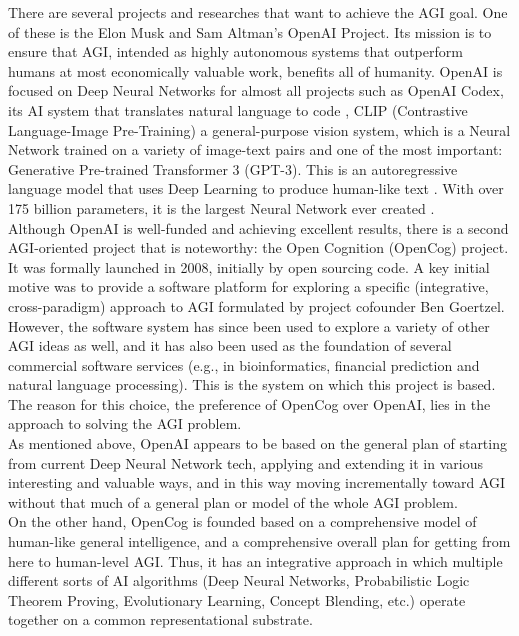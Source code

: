 There are several projects and researches that want to achieve the AGI goal. One of these is the Elon Musk and Sam Altman's OpenAI Project. 
Its mission is to ensure that AGI, intended as highly autonomous systems that outperform humans at most economically valuable work, benefits all of humanity.
OpenAI is focused on Deep Neural Networks for almost all projects such as OpenAI Codex, its AI system that translates natural language to code \cite{DBLP:journals/corr/abs-2107-03374}, CLIP (Contrastive Language-Image Pre-Training) a general-purpose vision system, which is a Neural Network trained on a variety of image-text pairs \cite{DBLP:journals/corr/abs-2103-00020} and one of the most important: Generative Pre-trained Transformer 3 (GPT-3). This is an autoregressive language model that uses Deep Learning to produce human-like text \cite{DBLP:journals/corr/abs-2005-14165}. With over 175 billion parameters, it is the largest Neural Network ever created \cite{romero_2021}. \\
Although OpenAI is well-funded and achieving excellent results, there is a second AGI-oriented project that is noteworthy: the Open Cognition (OpenCog) project. It was formally launched in 2008, initially by open sourcing code. A key initial motive was to provide a software platform for exploring a specific (integrative, cross-paradigm) approach to AGI formulated by project cofounder Ben Goertzel. However, the software system has since been used to explore a variety of other AGI ideas as well, and it has also been used as the foundation of several commercial software services (e.g., in bioinformatics, financial prediction and natural language processing). This is the system on which this project is based. \\
The reason for this choice, the preference of OpenCog over OpenAI, lies in the approach to solving the AGI problem.\\
As mentioned above, OpenAI appears to be based on the general plan of starting from current Deep Neural Network tech, applying and extending it in various interesting and valuable ways, and in this way moving incrementally toward AGI without that much of a general plan or model of the whole AGI problem.\\
On the other hand, OpenCog is founded based on a comprehensive model of human-like general intelligence, and a comprehensive overall plan for getting from here to human-level AGI. Thus, it has an integrative approach in which multiple different sorts of AI algorithms (Deep Neural Networks, Probabilistic Logic Theorem Proving, Evolutionary Learning, Concept Blending, etc.) operate together on a common representational substrate.
